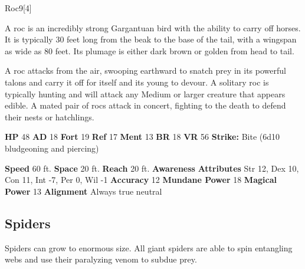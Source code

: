   
  \begin{monsection}{Roc}{9}[4]
    \vspace{-1em}\vspace{-1em}
    \vspace{0em}

    
        A roc is an incredibly strong Gargantuan bird with the ability to carry off horses.
        It is typically 30 feet long from the beak to the base of the tail, with a wingspan as wide as 80 feet.
        Its plumage is either dark brown or golden from head to tail.
      
        A roc attacks from the air, swooping earthward to snatch prey in its powerful talons and carry it off for itself and its young to devour.
        A solitary roc is typically hunting and will attack any Medium or larger creature that appears edible.
        A mated pair of rocs attack in concert, fighting to the death to defend their nests or hatchlings.
      

    \begin{spellcontent}
      \begin{spelltargetinginfo}
        \pari \textbf{HP} 48 \monsep
          \textbf{AD} 18 \monsep
          \textbf{Fort} 19 \monsep
          \textbf{Ref} 17 \monsep
          \textbf{Ment} 13
        \pari \textbf{BR} 18 \monsep
        \textbf{VR} 56
        \pari \textbf{Strike:}
            Bite  (6d10 bludgeoning and piercing)
      \end{spelltargetinginfo}
    \end{spellcontent}
    \begin{monsterfooter}
      \pari \textbf{Speed} 60 ft. \monsep
        \textbf{Space} 20 ft. \monsep
        \textbf{Reach} 20 ft.
      \pari \textbf{Awareness} 
      \pari \textbf{Attributes}
        Str 12, Dex 10,
        Con 11, Int -7,
        Per 0, Wil -1
      \pari \textbf{Accuracy} 12 \monsep
        \textbf{Mundane Power} 18 \monsep
      \textbf{Magical Power} 13
      \pari \textbf{Alignment} Always true neutral
    \end{monsterfooter}
  \end{monsection}
  
  
    \subsection{Spiders}
      
      Spiders can grow to enormous size.
      All giant spiders are able to spin entangling webs and use their paralyzing venom to subdue prey.
    
